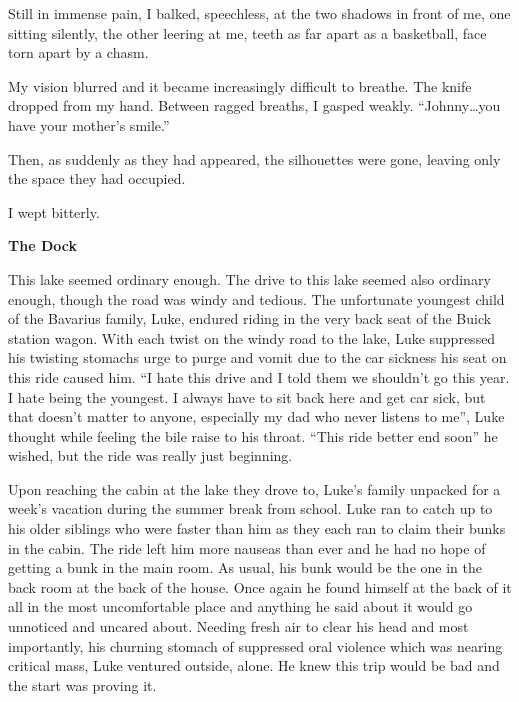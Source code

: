 Still in immense pain, I balked, speechless, at the two shadows in
front of me, one sitting silently, the other leering at me, teeth
as far apart as a basketball, face torn apart by a chasm.

My vision blurred and it became increasingly difficult to breathe.
The knife dropped from my hand. Between ragged breaths, I gasped
weakly. ``Johnny{\ldots}you have your mother's smile.''



Then, as suddenly as they had appeared, the silhouettes were gone,
leaving only the space they had occupied.



I wept bitterly. 
 





{\bf The Dock}

This lake seemed ordinary enough. The drive to this lake seemed
also ordinary enough, though the road was windy and tedious. The
unfortunate youngest child of the Bavarius family, Luke, endured
riding in the very back seat of the Buick station wagon. With each
twist on the windy road to the lake, Luke suppressed his twisting
stomachs urge to purge and vomit due to the car sickness his seat
on this ride caused him. ``I hate this drive and I told them
we shouldn't go this year. I hate being the youngest. I
always have to sit back here and get car sick, but that
doesn't matter to anyone, especially my dad who never listens
to me'', Luke thought while feeling the bile raise to his
throat. ``This ride better end soon'' he wished, but the
ride was really just beginning.



Upon reaching the cabin at the lake they drove to, Luke's
family unpacked for a week's vacation during the summer break
from school. Luke ran to catch up to his older siblings who were
faster than him as they each ran to claim their bunks in the cabin.
The ride left him more nauseas than ever and he had no hope of
getting a bunk in the main room. As usual, his bunk would be the
one in the back room at the back of the house. Once again he found
himself at the back of it all in the most uncomfortable place and
anything he said about it would go unnoticed and uncared about.
Needing fresh air to clear his head and most importantly, his
churning stomach of suppressed oral violence which was nearing
critical mass, Luke ventured outside, alone. He knew this trip
would be bad and the start was proving it.



